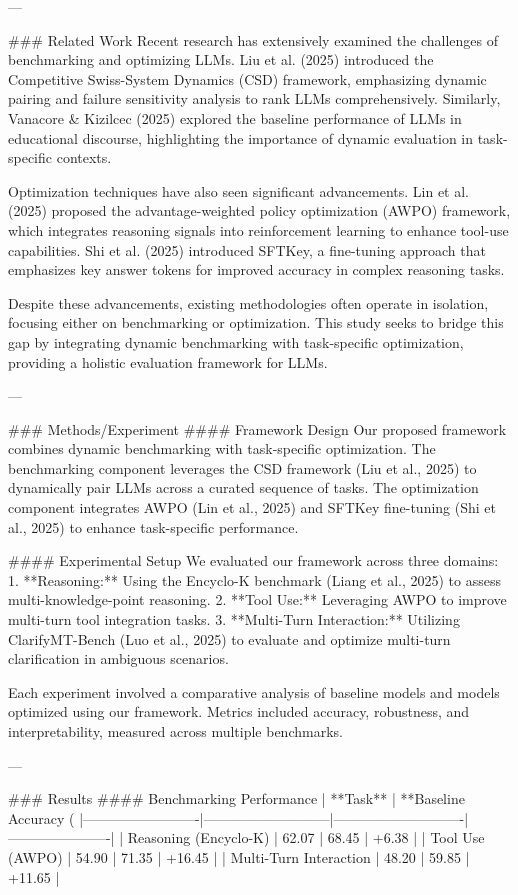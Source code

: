---

### Related Work  
Recent research has extensively examined the challenges of benchmarking and optimizing LLMs. Liu et al. (2025) introduced the Competitive Swiss-System Dynamics (CSD) framework, emphasizing dynamic pairing and failure sensitivity analysis to rank LLMs comprehensively. Similarly, Vanacore & Kizilcec (2025) explored the baseline performance of LLMs in educational discourse, highlighting the importance of dynamic evaluation in task-specific contexts.

Optimization techniques have also seen significant advancements. Lin et al. (2025) proposed the advantage-weighted policy optimization (AWPO) framework, which integrates reasoning signals into reinforcement learning to enhance tool-use capabilities. Shi et al. (2025) introduced SFTKey, a fine-tuning approach that emphasizes key answer tokens for improved accuracy in complex reasoning tasks.

Despite these advancements, existing methodologies often operate in isolation, focusing either on benchmarking or optimization. This study seeks to bridge this gap by integrating dynamic benchmarking with task-specific optimization, providing a holistic evaluation framework for LLMs.

---

### Methods/Experiment  
#### Framework Design  
Our proposed framework combines dynamic benchmarking with task-specific optimization. The benchmarking component leverages the CSD framework (Liu et al., 2025) to dynamically pair LLMs across a curated sequence of tasks. The optimization component integrates AWPO (Lin et al., 2025) and SFTKey fine-tuning (Shi et al., 2025) to enhance task-specific performance.

#### Experimental Setup  
We evaluated our framework across three domains:
1. **Reasoning:** Using the Encyclo-K benchmark (Liang et al., 2025) to assess multi-knowledge-point reasoning.
2. **Tool Use:** Leveraging AWPO to improve multi-turn tool integration tasks.
3. **Multi-Turn Interaction:** Utilizing ClarifyMT-Bench (Luo et al., 2025) to evaluate and optimize multi-turn clarification in ambiguous scenarios.

Each experiment involved a comparative analysis of baseline models and models optimized using our framework. Metrics included accuracy, robustness, and interpretability, measured across multiple benchmarks.

---

### Results  
#### Benchmarking Performance  
| **Task**               | **Baseline Accuracy (%
|-------------------------|---------------------------|----------------------------|----------------------|
| Reasoning (Encyclo-K)   | 62.07                    | 68.45                     | +6.38               |
| Tool Use (AWPO)         | 54.90                    | 71.35                     | +16.45              |
| Multi-Turn Interaction  | 48.20                    | 59.85                     | +11.65              |

